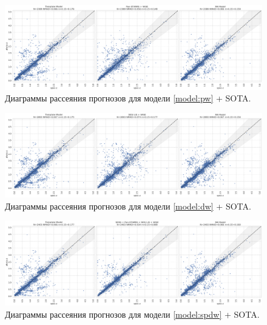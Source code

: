 \documentclass[fleqn,usenatbib]{mnras}
\begin{document}
\begin{figure}
    \centering
    \includegraphics[width=0.9\linewidth]{images/scatterplots-stripe82x-sota19.png}
    \caption{Диаграммы рассеяния прогнозов для модели \ref{model:pw} + SOTA.}
    \label{fig:s82x-sota19}
\end{figure}

\begin{figure}
    \centering
    \includegraphics[width=0.9\linewidth]{images/scatterplots-stripe82x-sota22.png}
    \caption{Диаграммы рассеяния прогнозов для модели \ref{model:dw} + SOTA.}
    \label{fig:s82x-sota22}
\end{figure}

\begin{figure}
    \centering
    \includegraphics[width=0.9\linewidth]{images/scatterplots-stripe82x-sota35.png}
    \caption{Диаграммы рассеяния прогнозов для модели \ref{model:spdw} + SOTA.}
    \label{fig:s82x-sota35}
\end{figure}
\end{document}
